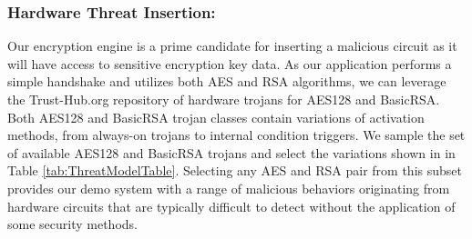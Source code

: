 \documentclass[sigconf]{acmart}
\theoremstyle{plain}
\theoremstyle{remark}
\begin{document}
\subsubsection{Hardware Threat Insertion:}
Our encryption engine is a prime candidate for inserting a malicious circuit as it will have access to sensitive encryption key data. As our application performs a simple handshake and utilizes both AES and RSA algorithms, we can leverage the Trust-Hub.org repository of hardware trojans for AES128 and BasicRSA. Both AES128 and BasicRSA trojan classes contain variations of activation methods, from always-on trojans to internal condition triggers. We sample the set of available AES128 and BasicRSA trojans and select the variations shown in in Table \ref{tab:ThreatModelTable}. Selecting any AES and RSA pair from this subset provides our demo system with a range of malicious behaviors originating from hardware circuits that are typically difficult to detect without the application of some security methods.
\end{document}
